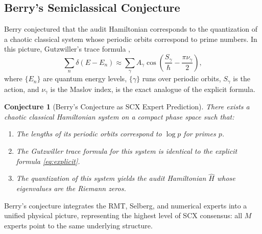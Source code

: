 \documentclass[12pt,a4paper]{article}
\newtheorem{conjecture}[theorem]{Conjecture}
\theoremstyle{remark}
\begin{document}
\subsection{Berry's Semiclassical Conjecture}
\label{sec:berry}
Berry \cite{Berry1986} conjectured that the audit Hamiltonian corresponds
to the quantization of a chaotic classical system whose periodic orbits
correspond to prime numbers. In this picture, Gutzwiller's trace formula
\cite{Gutzwiller1990},
\[
\sum_n \delta(E - E_n) \approx \sum_{\gamma} A_{\gamma}
\cos\!\left(\frac{S_{\gamma}}{\hbar} - \frac{\pi\nu_{\gamma}}{2}\right),
\]
where $\{E_n\}$ are quantum energy levels, $\{\gamma\}$ runs over periodic
orbits, $S_{\gamma}$ is the action, and $\nu_{\gamma}$ is the Maslov index,
is the exact analogue of the explicit formula.
\begin{conjecture}[Berry's Conjecture as SCX Expert Prediction]
\label{conj:berry}
There exists a chaotic classical Hamiltonian system on a compact phase
space such that:
\begin{enumerate}
  \item The lengths of its periodic orbits correspond to $\log p$ for
        primes $p$.
  \item The Gutzwiller trace formula for this system is identical to the
        explicit formula \eqref{eq:explicit}.
  \item The quantization of this system yields the audit Hamiltonian
        $\widehat{H}$ whose eigenvalues are the Riemann zeros.
\end{enumerate}
\end{conjecture}
Berry's conjecture integrates the RMT, Selberg, and numerical experts into
a unified physical picture, representing the highest level of SCX consensus:
all $M$ experts point to the same underlying structure.
\end{document}
